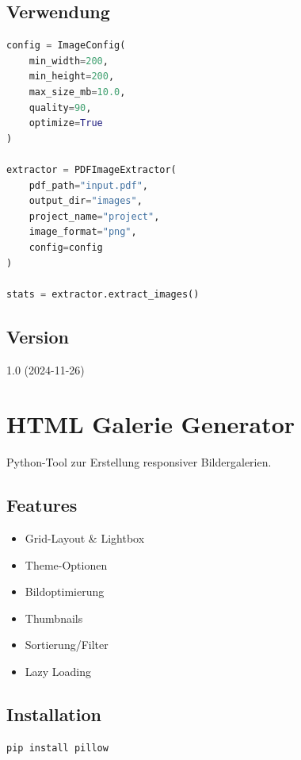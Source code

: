 \documentclass{content/vorlage-design-main}
\begin{document}
\subsection{Verwendung}\label{verwendung-4}

\begin{lstlisting}[language=Python]
config = ImageConfig(
    min_width=200,
    min_height=200,
    max_size_mb=10.0,
    quality=90,
    optimize=True
)

extractor = PDFImageExtractor(
    pdf_path="input.pdf",
    output_dir="images",
    project_name="project",
    image_format="png",
    config=config
)

stats = extractor.extract_images()
\end{lstlisting}

\subsection{Version}\label{version-3}

1.0 (2024-11-26)

\section{HTML Galerie Generator}\label{html-galerie-generator}

Python-Tool zur Erstellung responsiver Bildergalerien.

\subsection{Features}\label{features-4}

\begin{itemize}

\item
  Grid-Layout \& Lightbox
\item
  Theme-Optionen
\item
  Bildoptimierung
\item
  Thumbnails
\item
  Sortierung/Filter
\item
  Lazy Loading
\end{itemize}

\subsection{Installation}\label{installation-3}

\begin{lstlisting}[language=bash]
pip install pillow
\end{lstlisting}
\end{document}
